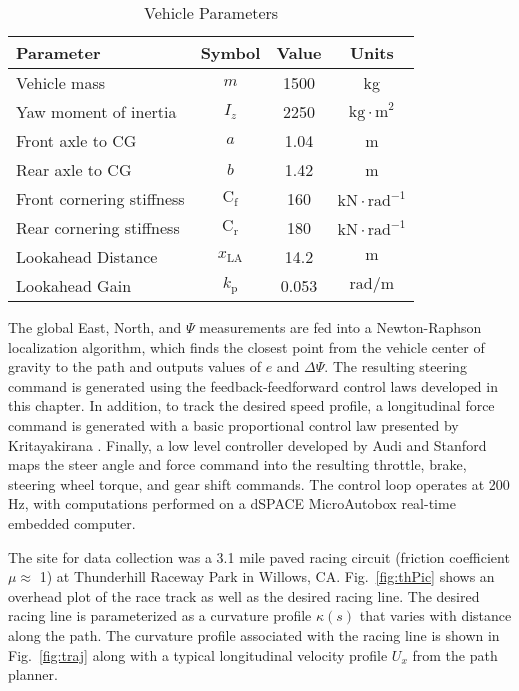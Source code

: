  
 \begin{table}[h]
\begin{center}
\caption{Vehicle Parameters}\label{tb:params}
\begin{tabular}{lccc}
Parameter & Symbol & Value & Units \\\hline
Vehicle mass & $m$ & 1500 & kg \\
Yaw moment of inertia & $I_z$ & 2250 & $\mathrm{kg \cdot m}^2$\\
Front axle to CG & $a$ & 1.04 & m\\
Rear axle to CG & $b$ & 1.42 & m\\
Front cornering stiffness & $\mathrm{C}_\mathrm{f}$ & 160 & $\mathrm{kN \cdot rad}^{-1}$ \\
Rear cornering stiffness & $\mathrm{C}_\mathrm{r}$ & 180 & $\mathrm{kN \cdot rad}^{-1}$ \\
Lookahead Distance		 & $x_\mathrm{LA}$         & 14.2 & $\mathrm{m}$ \\
Lookahead Gain         & $k_\mathrm{p}$         & 0.053 & $\mathrm{rad/m}$ \\\hline
\end{tabular}
\end{center}
\end{table}
 \newpage
 The global East, North, and $\Psi$ measurements
are fed into a Newton-Raphson localization algorithm, which finds the closest point from the vehicle
center of gravity to the path and outputs values of $e$ and $\Delta\Psi$. The resulting steering
command is generated using the feedback-feedforward control laws developed in this chapter. 
In addition, to track the desired speed profile, a longitudinal force command is generated with a basic 
proportional control law presented by Kritayakirana \cite{mickthesis}. Finally, a low level
controller developed by Audi and Stanford maps the
steer angle and force command into the resulting throttle, brake, steering wheel torque, and gear shift commands.  
The control loop operates at 200 Hz, with computations performed on a dSPACE MicroAutobox real-time embedded computer. 

The site for data collection was a 3.1 mile paved racing circuit (friction coefficient $\mu \approx$ 1) at Thunderhill Raceway Park in Willows, CA.
Fig.~\ref{fig:thPic} shows an overhead plot of the race track as well as the desired racing line. The desired racing
line is parameterized as a curvature profile $\kappa(s)$ that varies with distance along the path. The curvature
profile associated with the racing line is shown in Fig.~\ref{fig:traj}
along with a typical longitudinal velocity profile $U_x$ from the path planner.

